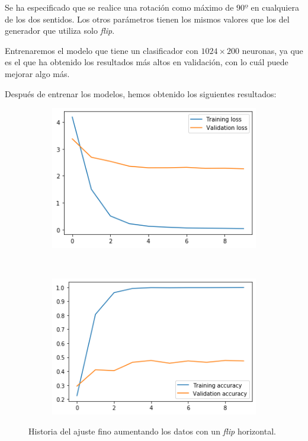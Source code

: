 \documentclass[11pt,a4paper]{article}
\begin{document}
Se ha especificado que se realice una rotación como máximo de $90º$ en cualquiera de los
dos sentidos. Los otros parámetros tienen los mismos valores que los del generador que
utiliza solo \textit{flip}.

Entrenaremos el modelo que tiene un clasificador con $1024 \times 200$ neuronas, ya que es
el que ha obtenido los resultados más altos en validación, con lo cuál puede mejorar algo más.

Después de entrenar los modelos, hemos obtenido los siguientes resultados:

\begin{figure}[H]
  \centering
  \begin{subfigure}{.5\textwidth}
    \centering
    \includegraphics[scale=0.4]{img/fine3f-loss.png}
    \label{fig:fine3f-loss}
  \end{subfigure}%
  ~ \quad
  \begin{subfigure}{.5\textwidth}
    \centering
    \includegraphics[scale=0.4]{img/fine3f-acc.png}
    \label{fig:fine3f-acc}
  \end{subfigure}
  \caption{Historia del ajuste fino aumentando los datos con un \textit{flip} horizontal.}
  \label{fig:history-fine3f}
\end{figure}
\end{document}

